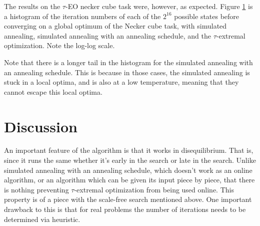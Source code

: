 \documentclass[12pt]{article}
\begin{document}

The results on the $\tau$-EO necker cube task were, however, as expected. Figure \ref{fig:speed} is a histogram of the iteration numbers of each of the $2^16$ possible states before converging on a global optimum of the Necker cube task, with simulated annealing, simulated annealing with an annealing schedule, and the $\tau$-extremal optimization. Note the log-log scale.

\begin{figure}
  \label{fig:speed}
\end{figure}

Note that there is a longer tail in the histogram for the simulated annealing with an annealing schedule. This is because in those cases, the simulated annealing is stuck in a local optima, and is also at a low temperature, meaning that they cannot escape this local optima.





\section{Discussion}

An important feature of the algorithm is that it works in disequilibrium. That is, since it runs the same whether it's early in the search or late in the search. Unlike simulated annealing with an annealing schedule, which doesn't work as an online algorithm, or an algorithm which can be given its input piece by piece, that there is nothing preventing $\tau$-extremal optimization from being used online. This property is of a piece with the scale-free search mentioned above. One important drawback to this is that for real problems the number of iterations needs to be determined via heuristic.
\end{document}
